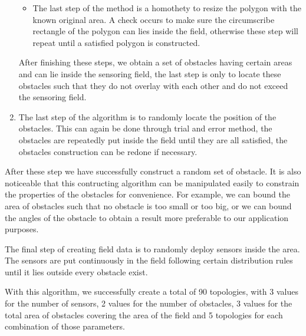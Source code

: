 \documentclass[final]{elsarticle}
\begin{document}
\begin{enumerate}
\begin{itemize}
		\item The last step of the method is a homothety to resize the polygon with the known original area. A check occurs to make sure the circumscribe rectangle of the polygon can lies inside the field, otherwise these step will repeat until a satisfied polygon is constructed.
	\end{itemize}
	After finishing these steps, we obtain a set of obstacles having certain areas and can lie inside the sensoring field, the last step is only to locate these obstacles such that they do not overlay with each other and do not exceed the sensoring field.
	\item The last step of the algorithm is to randomly locate the position of the obstacles. This can again be done through trial and error method, the obstacles are repeatedly put inside the field until they are all satisfied, the obstacles construction can be redone if necessary.
\end{enumerate}

After these step we have successfully construct a random set of obstacle. It is also noticeable that this contructing algorithm can be manipulated easily to constrain the properties of the obstacles for convenience. For example, we can bound the area of obstacles such that no obstacle is too small or too big, or we can bound the angles of the obstacle to obtain a result more preferable to our application purposes.

The final step of creating field data is to randomly deploy sensors inside the area. The sensors are put continuously in the field following certain distribution rules until it lies outside every obstacle exist.

With this algorithm, we successfully create a total of 90 topologies, with 3 values for the number of sensors, 2 values for the number of obstacles, 3 values for the total area of obstacles covering the area of the field and 5 topologies for each combination of those parameters.
\end{document}
